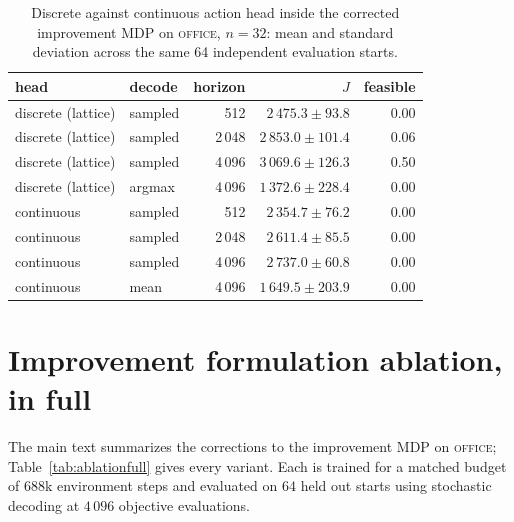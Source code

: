 \documentclass[11pt]{article}
\begin{document}
\begin{table}[htbp]
\centering
\caption{Discrete against continuous action head inside the corrected
improvement MDP on \textsc{office}, $n=32$: mean and standard deviation across
the same 64 independent evaluation starts.}
\label{tab:granularity}
\footnotesize
\begin{tabular}{@{}llrrr@{}}
\toprule
head & decode & horizon & $J$ & feasible \\
\midrule
discrete (lattice) & sampled & 512    & $2\,475.3\pm93.8$  & 0.00 \\
discrete (lattice) & sampled & 2\,048 & $2\,853.0\pm101.4$ & 0.06 \\
discrete (lattice) & sampled & 4\,096 & $3\,069.6\pm126.3$ & 0.50 \\
discrete (lattice) & argmax  & 4\,096 & $1\,372.6\pm228.4$ & 0.00 \\
continuous & sampled & 512    & $2\,354.7\pm76.2$  & 0.00 \\
continuous & sampled & 2\,048 & $2\,611.4\pm85.5$  & 0.00 \\
continuous & sampled & 4\,096 & $2\,737.0\pm60.8$  & 0.00 \\
continuous & mean    & 4\,096 & $1\,649.5\pm203.9$ & 0.00 \\
\bottomrule
\end{tabular}
\end{table}

\section{Improvement formulation ablation, in full}
\label{app:ablation}
The main text summarizes the corrections to the improvement MDP on
\textsc{office}; Table~\ref{tab:ablationfull} gives every variant. Each is
trained for a matched budget of $688$k environment steps and evaluated on $64$
held out starts using stochastic decoding at $4\,096$ objective evaluations.
\end{document}
